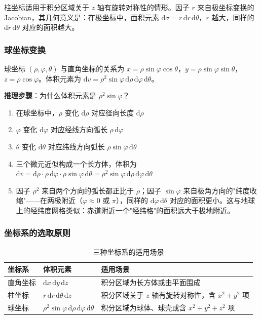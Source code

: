 柱坐标适用于积分区域关于 $z$ 轴有旋转对称性的情形。因子 $r$ 来自极坐标变换的 Jacobian，其几何意义是：在极坐标中，面积元素 $\mathrm{d}\sigma = r\,\mathrm{d}r\,\mathrm{d}\theta$，$r$ 越大，同样的 $\mathrm{d}r\,\mathrm{d}\theta$ 对应的面积越大。

\subsubsection{球坐标变换}

球坐标 $(\rho, \varphi, \theta)$ 与直角坐标的关系为 $x=\rho\sin\varphi\cos\theta$，$y=\rho\sin\varphi\sin\theta$，$z=\rho\cos\varphi$。体积元素为 $\mathrm{d}v = \rho^2\sin\varphi\,\mathrm{d}\rho\,\mathrm{d}\varphi\,\mathrm{d}\theta$。

\begin{insightbox}
\textbf{推理步骤}：为什么体积元素是 $\rho^2\sin\varphi$？
\begin{enumerate}[leftmargin=2em]
    \item 在球坐标中，$\rho$ 变化 $\mathrm{d}\rho$ 对应径向长度 $\mathrm{d}\rho$
    \item $\varphi$ 变化 $\mathrm{d}\varphi$ 对应经线方向弧长 $\rho\,\mathrm{d}\varphi$
    \item $\theta$ 变化 $\mathrm{d}\theta$ 对应纬线方向弧长 $\rho\sin\varphi\,\mathrm{d}\theta$
    \item 三个微元近似构成一个长方体，体积为 $\mathrm{d}v = \mathrm{d}\rho \cdot \rho\,\mathrm{d}\varphi \cdot \rho\sin\varphi\,\mathrm{d}\theta = \rho^2\sin\varphi\,\mathrm{d}\rho\,\mathrm{d}\varphi\,\mathrm{d}\theta$
    \item 因子 $\rho^2$ 来自两个方向的弧长都正比于 $\rho$；因子 $\sin\varphi$ 来自极角方向的"纬度收缩"——在两极附近（$\varphi\approx 0$ 或 $\pi$），同样的 $\mathrm{d}\varphi\,\mathrm{d}\theta$ 对应的面积更小。这与地球上的经纬度网格类似：赤道附近一个"经纬格"的面积远大于极地附近。
\end{enumerate}
\end{insightbox}

\subsubsection{坐标系的选取原则}

\begin{table}[htbp]
\centering
\caption{三种坐标系的适用场景}
\begin{tabularx}{0.95\textwidth}{llX}
\toprule
\textbf{坐标系} & \textbf{体积元素} & \textbf{适用场景} \\
\midrule
直角坐标 & $\mathrm{d}x\,\mathrm{d}y\,\mathrm{d}z$ & 积分区域为长方体或由平面围成 \\
柱坐标 & $r\,\mathrm{d}r\,\mathrm{d}\theta\,\mathrm{d}z$ & 积分区域关于 $z$ 轴有旋转对称性，含 $x^2+y^2$ 项 \\
球坐标 & $\rho^2\sin\varphi\,\mathrm{d}\rho\,\mathrm{d}\varphi\,\mathrm{d}\theta$ & 积分区域为球体、球壳或含 $x^2+y^2+z^2$ 项 \\
\bottomrule
\end{tabularx}
\end{table}

